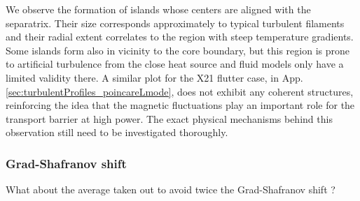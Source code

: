 We observe the formation of islands whose centers are aligned with the separatrix. Their size corresponds approximately to typical turbulent filaments and their radial extent correlates to the region with steep temperature gradients. Some islands form also in vicinity to the core boundary, but this region is prone to artificial turbulence from the close heat source and fluid models  only have a limited validity there. A similar plot for the X21 flutter case, in App. \ref{sec:turbulentProfiles_poincareLmode}, does not exhibit any coherent structures, reinforcing the idea that the magnetic fluctuations play an important role for the transport barrier at high power. The exact physical mechanisms behind this observation still need to be investigated thoroughly.


\subsubsection{Grad-Shafranov shift}

What about the average taken out to avoid twice the Grad-Shafranov shift ? 



